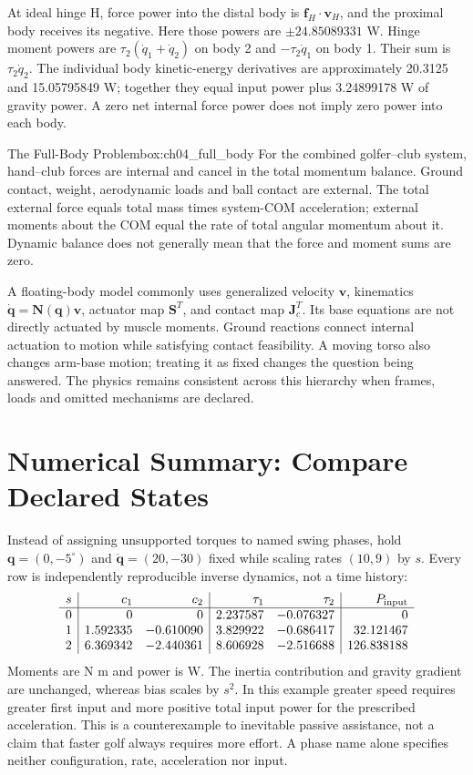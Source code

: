At ideal hinge H, force power into the distal body is \(\bm f_H\cdot\bm v_H\), and the proximal body receives its negative. Here those powers are \(\pm24.85089331\) W. Hinge moment powers are \(\tau_2(\dot q_1+\dot q_2)\) on body 2 and \(-\tau_2\dot q_1\) on body 1. Their sum is \(\tau_2\dot q_2\). The individual body kinetic-energy derivatives are approximately 20.3125 and 15.05795849 W; together they equal input power plus 3.24899178 W of gravity power. A zero net internal force power does not imply zero power into each body.

\begin{laymansbox}{The Full-Body Problem}{box:ch04_full_body}
For the combined golfer–club system, hand–club forces are internal and cancel in the total momentum balance. Ground contact, weight, aerodynamic loads and ball contact are external. The total external force equals total mass times system-COM acceleration; external moments about the COM equal the rate of total angular momentum about it. Dynamic balance does not generally mean that the force and moment sums are zero.

A floating-body model commonly uses generalized velocity \(\bm v\), kinematics \(\dot{\bm q}=\bm N(\bm q)\bm v\), actuator map \(\bm S^T\), and contact map \(\bm J_c^T\). Its base equations are not directly actuated by muscle moments. Ground reactions connect internal actuation to motion while satisfying contact feasibility. A moving torso also changes arm-base motion; treating it as fixed changes the question being answered. The physics remains consistent across this hierarchy when frames, loads and omitted mechanisms are declared.
\end{laymansbox}

\section{Numerical Summary: Compare Declared States}

Instead of assigning unsupported torques to named swing phases, hold \(\bm q=(0,-5^\circ)\) and \(\ddot{\bm q}=(20,-30)\) fixed while scaling rates \((10,9)\) by \(s\). Every row is independently reproducible inverse dynamics, not a time history:
\[
\begin{array}{c|rr|rr|r}
s&c_1&c_2&\tau_1&\tau_2&P_{\rm input}\\\hline
0&0&0&2.237587&-0.076327&0\\
1&1.592335&-0.610090&3.829922&-0.686417&32.121467\\
2&6.369342&-2.440361&8.606928&-2.516688&126.838188
\end{array}
\]
Moments are N m and power is W. The inertia contribution and gravity gradient are unchanged, whereas bias scales by \(s^2\). In this example greater speed requires greater first input and more positive total input power for the prescribed acceleration. This is a counterexample to inevitable passive assistance, not a claim that faster golf always requires more effort. A phase name alone specifies neither configuration, rate, acceleration nor input.

